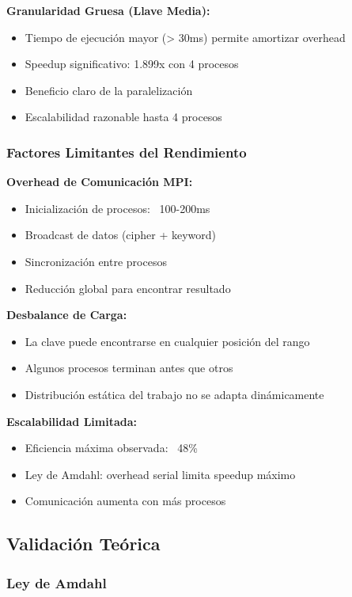 \documentclass[12pt,letterpaper]{article}
\begin{document}
\textbf{Granularidad Gruesa (Llave Media):}
\begin{itemize}
    \item Tiempo de ejecución mayor (> 30ms) permite amortizar overhead
    \item Speedup significativo: 1.899x con 4 procesos
    \item Beneficio claro de la paralelización
    \item Escalabilidad razonable hasta 4 procesos
\end{itemize}

\subsubsection{Factores Limitantes del Rendimiento}

\textbf{Overhead de Comunicación MPI:}
\begin{itemize}
    \item Inicialización de procesos: ~100-200ms
    \item Broadcast de datos (cipher + keyword)
    \item Sincronización entre procesos
    \item Reducción global para encontrar resultado
\end{itemize}

\textbf{Desbalance de Carga:}
\begin{itemize}
    \item La clave puede encontrarse en cualquier posición del rango
    \item Algunos procesos terminan antes que otros
    \item Distribución estática del trabajo no se adapta dinámicamente
\end{itemize}

\textbf{Escalabilidad Limitada:}
\begin{itemize}
    \item Eficiencia máxima observada: ~48\%
    \item Ley de Amdahl: overhead serial limita speedup máximo
    \item Comunicación aumenta con más procesos
\end{itemize}

\subsection{Validación Teórica}

\subsubsection{Ley de Amdahl}
\end{document}

